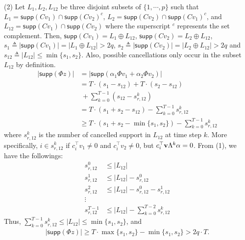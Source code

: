 {\begin{pf}
(2) Let $L_1, L_2, L_{12}$ be three disjoint subsets of $\{1,\cdots, p\}$ such that $L_1 = \textsf{supp} (C v_1) \cap \textsf{supp}(C v_2)^c $, $L_2 = \textsf{supp} (Cv_2) \cap \textsf{supp} (C v_1)^c $, and $L_{12} = \textsf{supp} (C v_1) \cap \textsf{supp} (C v_2)$ where the superscript $^c$ represents the set complement. Then, $\textsf{supp} (C v_1)  = L_1 \oplus L_{12}$, $\textsf{supp} (C v_2)  = L_2 \oplus L_{12}$, $ s_1 \triangleq \lvert \textsf{supp} (C v_1) \rvert = \lvert  L_1 \oplus L_{12} \rvert > 2q$,  $s_2 \triangleq \lvert \textsf{supp} ( C v_2) \rvert =  \lvert L_2 \oplus L_{12} \rvert > 2q $ and $s_{12} \triangleq \lvert  L_{12} \rvert \le \min \{s_1, s_2\}$. 
Also, possible cancellations only occur in the subset $L_{12}$ by definition. 
\begin{equation}
\begin{aligned}
	\lvert \textsf{supp} (\Phi z) \rvert &= \lvert \textsf{supp} (\alpha_1 \Phi v_1 + \alpha_2 \Phi v_2) \vert  \\&= T \cdot (s_1 - s_{12}) + T\cdot (s_2 - s_{12}) \\ &~+ \sum_{k=0}^{T-1} (s_{12}- s_{r,12}^k) \\
	&=T \cdot (s_1 + s_2 - s_{12}) - \sum_{k=0}^{T-1} s_{r,12}^k \\&
	\ge T  \cdot(s_1 + s_2 - \min \{ s_1, s_2 \}) - \sum_{k=0}^{T-1} s_{r,12}^k \nonumber
\end{aligned}
\end{equation}
where $s_{r,12}^k$ is the number of cancelled support in $L_{12}$ at time step $k$. 
More specifically, $i \in s_{r,12}^k$ if $c_i^\top v_1 \neq 0$ and $c_i^\top v_2 \neq 0$, but $c_i^\top{\bf v}\Lambda^k \alpha = 0$.
From (1), we have the followings:
\begin{equation}
\begin{aligned}
	s_{r,12}^0 &\le \lvert L_{12} \rvert \\
	s_{r,12}^1 &\le \lvert L_{12} \rvert - s_{r,12}^0 \\
	s_{r,12}^2 &\le \lvert L_{12} \rvert - s_{r,12}^0 - s_{r,12}^1 \\
	\vdots & \\
	s_{r,12}^{T-1} & \le \lvert L_{12} \rvert - \sum_{k=0}^{T-2} s_{r,12}^k \nonumber 
\end{aligned}
\end{equation}
Thus, $\sum_{k=0}^{T-1}  s_{r,12}^k \le \lvert L_{12} \vert \le \min \{s_1, s_2 \} $, and
\begin{equation}
\begin{aligned}
	\lvert \textsf{supp} (\Phi z) \vert \ge T \cdot \max\{ s_1, s_2 \} - \min \{ s_1, s_2 \}  > 2q \cdot T .\nonumber 
\end{aligned}
\end{equation}
\end{pf}


}
